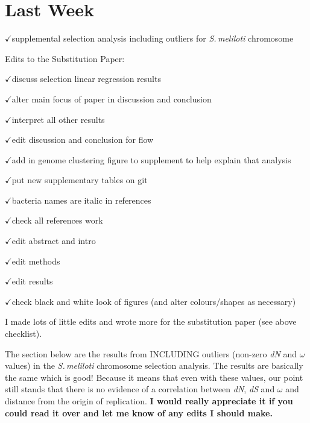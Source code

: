 \documentclass[12pt]{article}
\newcommand{\smel}{\textit{S.\,meliloti}\xspace}
\newcommand{\ch}{$\checkmark$}
\newcommand{\dn}{\textit{dN}\xspace}
\newcommand{\ds}{\textit{dS}\xspace}
\begin{document}
	
\section*{Last Week}

\ch supplemental selection analysis including outliers for \smel chromosome

Edits to the Substitution Paper:

\ch discuss selection linear regression results

\ch alter main focus of paper in discussion and conclusion

\ch interpret all other results

\ch edit discussion and conclusion for flow

\ch add in genome clustering figure to supplement to help explain that analysis

\ch put new supplementary tables on git

\ch bacteria names are italic in references

\ch check all references work

\ch edit abstract and intro

\ch edit methods

\ch edit results

\ch check black and white look of figures (and alter colours/shapes as necessary) 

I made lots of little edits and wrote more for the substitution paper (see above checklist).

The section below are the results from INCLUDING outliers (non-zero \dn and $\omega$ values) in the \smel chromosome selection analysis.
The results are basically the same which is good! Because it means that even with these values, our point still stands that there is no evidence of a correlation between \dn, \ds and $\omega$ and distance from the origin of replication. \textbf{I would really appreciate it if you could read it over and let me know of any edits I should make.}

\end{document}

